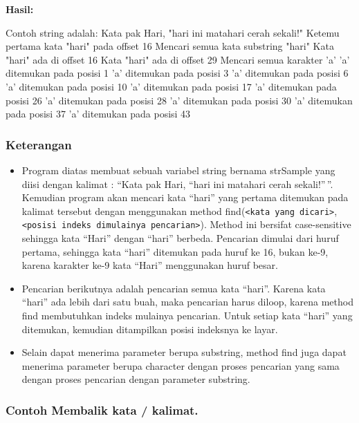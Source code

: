 \textbf{Hasil:}

\begin{lcverbatim}
Contoh string adalah:
Kata pak Hari, "hari ini matahari cerah sekali!"
Ketemu pertama kata "hari" pada offset 16
Mencari semua kata substring "hari"
Kata "hari" ada di offset 16
Kata "hari" ada di offset 29
Mencari semua karakter 'a'
'a' ditemukan pada posisi 1
'a' ditemukan pada posisi 3
'a' ditemukan pada posisi 6
'a' ditemukan pada posisi 10
'a' ditemukan pada posisi 17
'a' ditemukan pada posisi 26
'a' ditemukan pada posisi 28
'a' ditemukan pada posisi 30
'a' ditemukan pada posisi 37
'a' ditemukan pada posisi 43
\end{lcverbatim}

\subsubsection*{Keterangan}

\begin{itemize}

\item
  Program diatas membuat sebuah variabel string bernama strSample yang
  diisi dengan kalimat : ``Kata pak Hari, ``hari ini matahari cerah
  sekali!''\,''. Kemudian program akan mencari kata ``hari'' yang
  pertama ditemukan pada kalimat tersebut dengan menggunakan method
  find(\texttt{\textless{}kata\ yang\ dicari\textgreater{}},\texttt{\textless{}posisi\ indeks\ dimulainya\ pencarian\textgreater{}}).
  Method ini bersifat case-sensitive sehingga kata ``Hari'' dengan
  ``hari'' berbeda. Pencarian dimulai dari huruf pertama, sehingga kata
  ``hari'' ditemukan pada huruf ke 16, bukan ke-9, karena karakter ke-9
  kata ``Hari'' menggunakan huruf besar.
\item
  Pencarian berikutnya adalah pencarian semua kata ``hari''. Karena kata
  ``hari'' ada lebih dari satu buah, maka pencarian harus diloop, karena
  method find membutuhkan indeks mulainya pencarian. Untuk setiap kata
  ``hari'' yang ditemukan, kemudian ditampilkan posisi indeksnya ke
  layar.
\item
  Selain dapat menerima parameter berupa substring, method find juga
  dapat menerima parameter berupa character dengan proses pencarian yang
  sama dengan proses pencarian dengan parameter substring.
\end{itemize}

\subsubsection*{Contoh  Membalik kata / kalimat.}

